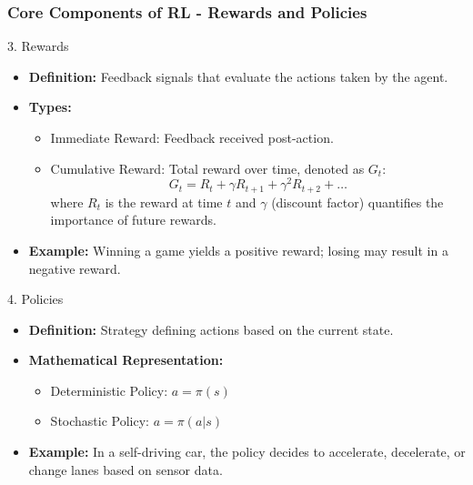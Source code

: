 \documentclass[aspectratio=169]{beamer}
\begin{document}
\begin{frame}[fragile]
    \frametitle{Core Components of RL - Rewards and Policies}
    \begin{block}{3. Rewards}
        \begin{itemize}
            \item \textbf{Definition:} Feedback signals that evaluate the actions taken by the agent.
            \item \textbf{Types:}
            \begin{itemize}
                \item Immediate Reward: Feedback received post-action.
                \item Cumulative Reward: Total reward over time, denoted as \( G_t \):
                \begin{equation}
                    G_t = R_t + \gamma R_{t+1} + \gamma^2 R_{t+2} + \ldots
                \end{equation}
                where \( R_t \) is the reward at time \( t \) and \( \gamma \) (discount factor) quantifies the importance of future rewards.
            \end{itemize}
            \item \textbf{Example:} Winning a game yields a positive reward; losing may result in a negative reward.
        \end{itemize}
    \end{block}

    \begin{block}{4. Policies}
        \begin{itemize}
            \item \textbf{Definition:} Strategy defining actions based on the current state.
            \item \textbf{Mathematical Representation:}
            \begin{itemize}
                \item Deterministic Policy: \( a = \pi(s) \)
                \item Stochastic Policy: \( a = \pi(a | s) \)
            \end{itemize}
            \item \textbf{Example:} In a self-driving car, the policy decides to accelerate, decelerate, or change lanes based on sensor data.
        \end{itemize}
    \end{block}
\end{frame}
\end{document}
